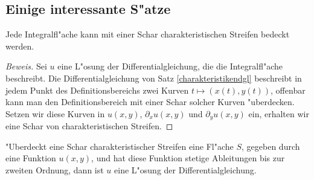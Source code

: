 \subsection{Einige interessante S"atze}

\begin{satz}Jede Integralfl"ache kann mit einer Schar
charakteristischen Streifen bedeckt werden.
\end{satz}

\begin{proof}[Beweis]
Sei $u$ eine L"osung der Differentialgleichung, die die Integralfl"ache beschreibt.
Die Differentialgleichung von Satz \ref{charakteristikendgl}
beschreibt in jedem Punkt des Definitionsbereichs zwei Kurven $t\mapsto(x(t),y(t))$,
offenbar kann man den Definitionsbereich mit einer Schar solcher Kurven
"uberdecken.
Setzen wir diese Kurven in $u(x,y)$, $\partial_xu(x,y)$
und $\partial_yu(x,y)$ ein, erhalten wir eine Schar von charakteristischen
Streifen.
\end{proof}

\begin{satz}"Uberdeckt eine Schar charakteristischer Streifen
eine Fl"ache $S$, gegeben durch eine Funktion $u(x,y)$, und hat
diese Funktion stetige Ableitungen bis zur zweiten Ordnung,
dann ist $u$ eine L"osung der Differentialgleichung.
\end{satz}

